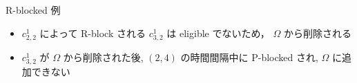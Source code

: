 \begin{frame}{R-blocked 例}
    \vspace{\headerheight}
    \centering
\end{frame}

\begin{frame}{}
    \begin{itemize}
        \item $c_{2,2}^{1}$ によって R-block される $c_{3,2}^{1}$ は eligible でないため， $\Omega$ から削除される
        \item $c_{3,2}^{1}$ が $\Omega$ から削除された後, $(2,4)$ の時間間隔中に P-blocked され, $\Omega$ に追加できない
    \end{itemize}
\end{frame}
